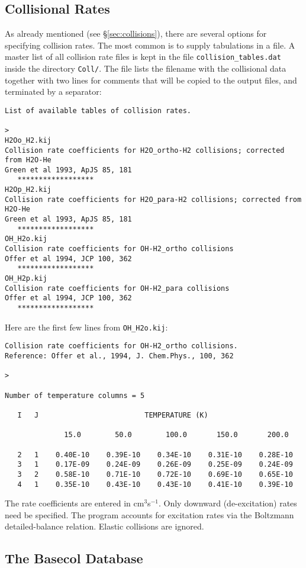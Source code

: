\documentclass[12pt]{article}
\begin{document}
\subsection{Collisional Rates}
As already mentioned (see \S\ref{sec:collisions}), there are several options
for specifying collision rates. The most common is to supply tabulations in a
file. A master list of all collision rate files is kept in the file
\texttt{collision\_tables.dat} inside the directory \texttt{Coll/}. The file
lists the filename with the collisional data together with two lines for
comments that will be copied to the output files, and terminated by a
separator:
\begin{verbatim}
List of available tables of collision rates.

>
H2Oo_H2.kij
Collision rate coefficients for H2O_ortho-H2 collisions; corrected from H2O-He
Green et al 1993, ApJS 85, 181
   ******************
H2Op_H2.kij
Collision rate coefficients for H2O_para-H2 collisions; corrected from H2O-He
Green et al 1993, ApJS 85, 181
   ******************
OH_H2o.kij
Collision rate coefficients for OH-H2_ortho collisions
Offer et al 1994, JCP 100, 362
   ******************
OH_H2p.kij
Collision rate coefficients for OH-H2_para collisions
Offer et al 1994, JCP 100, 362
   ******************
\end{verbatim}


Here are the first few lines from \texttt{OH\_H2o.kij}:
\begin{verbatim}
Collision rate coefficients for OH-H2_ortho collisions.
Reference: Offer et al., 1994, J. Chem.Phys., 100, 362

>

Number of temperature columns = 5

   I   J                         TEMPERATURE (K)

              15.0        50.0        100.0       150.0       200.0

   2   1    0.40E-10    0.39E-10    0.34E-10    0.31E-10    0.28E-10
   3   1    0.17E-09    0.24E-09    0.26E-09    0.25E-09    0.24E-09
   3   2    0.58E-10    0.71E-10    0.72E-10    0.69E-10    0.65E-10
   4   1    0.35E-10    0.43E-10    0.43E-10    0.41E-10    0.39E-10
\end{verbatim}
The rate coefficients are entered in cm$^3$s$^{-1}$.  Only downward
(de-excitation) rates need be specified. The program accounts for excitation
rates via the Boltzmann detailed-balance relation. Elastic collisions are
ignored.

\subsection{The Basecol Database}
\end{document}
